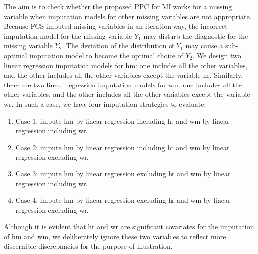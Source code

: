 	The aim is to check whether the proposed PPC for MI works for a missing variable when imputation models for other missing variables are not appropriate. Because FCS imputed missing variables in an iteration way, the incorrect imputation model for the missing variable $Y_1$ may disturb the diagnostic for the missing variable $Y_2$. The deviation of the distribution of $Y_1$ may cause a sub-optimal imputation model to become the optimal choice of $Y_2$. We design two linear regression imputation models for hm: one includes all the other variables, and the other includes all the other variables except the variable hr. Similarly, there are two linear regression imputation models for wm: one includes all the other variables, and the other includes all the other variables except the variable wr. In such a case, we have four imputation strategies to evaluate:
	\begin{enumerate}
		\item Case 1: impute hm by linear regression including hr and wm by linear regression including wr.
		\item Case 2: impute hm by linear regression including hr and wm by linear regression excluding wr.
		\item Case 3: impute hm by linear regression excluding hr and wm by linear regression including wr.
		\item Case 4: impute hm by linear regression excluding hr and wm by linear regression excluding wr.
	\end{enumerate}
	Although it is evident that hr and wr are significant covariates for the imputation of hm and wm, we deliberately ignore these two variables to reflect more discernible discrepancies for the purpose of illustration. 

